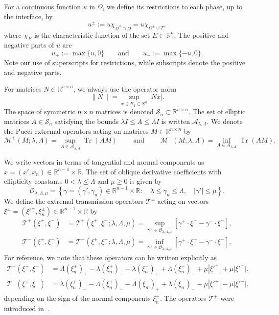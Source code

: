 \documentclass[letter,11pt]{amsart}
\newcommand{\R}{\mathbb{R}}
\newcommand{\tr}[1]{\operatorname{Tr}(#1)}
\newcommand{\chara}[1]{\chi_{#1}}
\newcommand{\id}{I}
\newcommand{\ellmat}{\mathcal{A}_{\lambda, \Lambda}}
\newcommand{\ellvec}{\mathcal{O}_{\lambda,\Lambda,\mu}}
\newcommand{\mcal}{\mathcal{M}}
\newcommand{\tcal}{\mathcal{T}}
\newcommand{\scal}{\mathcal{S}}
\theoremstyle{definition}
\numberwithin{equation}{section}
\begin{document}
\medskip

For a continuous function $u$ in $\Omega$, we define its restrictions to each phase, up to the interface, by
\[
u^{\pm} := u \chara{\overline{\Omega}^{\pm} \cap \Omega} = u \chara{\Omega^{\pm} \cup T},
\]
where $\chara{E}$ is the characteristic function of the set $E \subset \R^{n}$.
The positive and negative parts of $u$ are
\[
u_{+} := \max\{u, 0\} \qquad \text{and} \qquad u_{-} := \max\{-u, 0\}.
\]
Note our use of superscripts for restrictions, while subscripts denote the positive and negative parts.

\medskip

For matrices $N \in \R^{n\times n}$, we always use the operator norm
\[
\|N\| = \sup_{x \in B_1 \subset \R^{n}} |N x|.
\]
The space of symmetric $n \times n$ matrices is denoted
$\scal_n \subset \R^{n\times n}$.
The set of elliptic matrices $A \in \scal_n$ satisfying the bounds $\lambda \id \leq A \leq \Lambda \id$ is written $\ellmat$.
We denote the Pucci extremal operators acting on matrices $M \in \R^{n\times n}$ by
\[
\mcal^{+}(M; \lambda, \Lambda) = \sup_{A \in \ellmat}  \tr{A M} \qquad \text{ and } \qquad \mcal^{-}(M; \lambda, \Lambda) = \inf_{A \in \ellmat}  \tr{A M}.
\]

\medskip

 We write vectors in terms of tangential and normal components as $x = (x', x_n) \in \R^{n-1} \times \R$.
The set of oblique derivative coefficients with ellipticity constants $0 < \lambda \leq \Lambda$ and $\mu \geq 0$ is given by
\[
\ellvec = 
\left\{
\gamma = (\gamma', \gamma_n) \in \R^{n-1} \times \R \colon \quad \lambda \leq \gamma_n \leq \Lambda, \quad |\gamma'| \leq \mu
\right\}.
\]
We define the extremal transmission operators $\tcal^{\pm}$ acting on vectors $\xi^{\pm} = (\xi'^{\pm}, \xi_n^{\pm}) \in \R^{n-1}\times \R$ by
\[
\begin{split}
\tcal^{+}(\xi^{+}, \xi^{-}) 
&= \tcal^{+}(\xi^{+}, \xi^{-}; \lambda,\Lambda,\mu)
= \sup_{\gamma^{\pm} \in \ellvec} \left[\gamma^{+} \cdot \xi^{+} - \gamma^{-} \cdot \xi^{-}\right],\\
\tcal^{-}(\xi^{+}, \xi^{-})  
&= \tcal^{-}(\xi^{+}, \xi^{-}; \lambda,\Lambda,\mu)
= \inf_{\gamma^{\pm} \in \ellvec} \left[\gamma^{+} \cdot \xi^{+} - \gamma^{-} \cdot \xi^{-}\right].
\end{split}
\]
For reference, we note that these operators can be written explicitly as
\begin{equation}
\label{tminus}
\begin{split}
\tcal^{+}(\xi^{+}, \xi^{-}) &= 
\Lambda (\xi_n^{+})_{+} - \lambda (\xi_n^{+})_{-}
- \lambda (\xi_n^{-})_{+}+ \Lambda (\xi_n^{-})_{-}
+ \mu |\xi'^{+}| + \mu |\xi'^{-}|,\\
\tcal^{-}(\xi^{+}, \xi^{-}) &= 
\lambda (\xi_n^{+})_{+} - \Lambda (\xi_n^{+})_{-}
- \Lambda (\xi_n^{-})_{+}+ \lambda (\xi_n^{-})_{-}
- \mu |\xi'^{+}| - \mu |\xi'^{-}|,
\end{split}
\end{equation}
depending on the sign of the normal components $\xi^{\pm}_{n}$.
The operators $\tcal^{\pm}$ were introduced in~\cite{E}.
\end{document}
